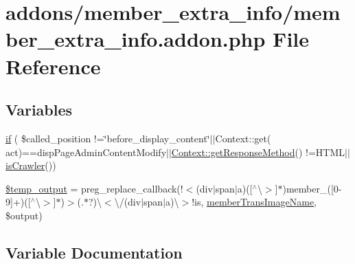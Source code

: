 \hypertarget{member__extra__info_8addon_8php}{}\section{addons/member\+\_\+extra\+\_\+info/member\+\_\+extra\+\_\+info.addon.\+php File Reference}
\label{member__extra__info_8addon_8php}
\subsection*{Variables}
\begin{DoxyCompactItemize}
\item 
\hyperlink{member__extra__info_8addon_8php_a343bf9bf16148d253aa65319de0b3f16}{if} ( \$called\+\_\+position !=\char`\"{}before\+\_\+display\+\_\+content\char`\"{}$\vert$$\vert$Context\+::get( \textquotesingle{}act\textquotesingle{})==\textquotesingle{}disp\+Page\+Admin\+Content\+Modify\textquotesingle{}$\vert$$\vert$\hyperlink{classContext_a1d02a15209360034cd719d8b08cb5061}{Context\+::get\+Response\+Method}() !=\textquotesingle{}H\+T\+ML\textquotesingle{}$\vert$$\vert$\hyperlink{func_8inc_8php_a490ffbd4821da1995c76c381553d5b3d}{is\+Crawler}())
\item 
\hyperlink{member__extra__info_8addon_8php_a5866ef6f77cbeaf87d8208cf805bbc3d}{\$temp\+\_\+output} = preg\+\_\+replace\+\_\+callback(\textquotesingle{}!$<$(div$\vert$span$\vert$a)(\mbox{[}$^\wedge$\textbackslash{}$>$\mbox{]}$\ast$)member\+\_\+(\mbox{[}0-\/9\mbox{]}+)(\mbox{[}$^\wedge$\textbackslash{}$>$\mbox{]}$\ast$)$>$(.$\ast$?)\textbackslash{}$<$\textbackslash{}/(div$\vert$span$\vert$a)\textbackslash{}$>$!is\textquotesingle{}, \textquotesingle{}\hyperlink{member__extra__info_8lib_8php_a21882e797e0da66aed32f1cf3053eaf2}{member\+Trans\+Image\+Name}\textquotesingle{}, \$output)
\end{DoxyCompactItemize}


\subsection{Variable Documentation}
\hypertarget{member__extra__info_8addon_8php_a5866ef6f77cbeaf87d8208cf805bbc3d}{}\label{member__extra__info_8addon_8php_a5866ef6f77cbeaf87d8208cf805bbc3d} 

